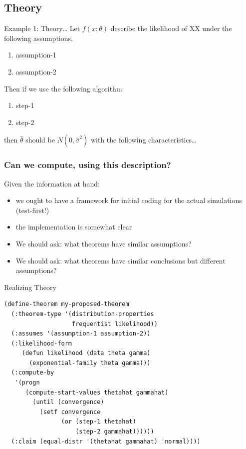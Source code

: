 \documentclass{beamer}
\begin{document}
\subsection{Theory}


\begin{frame}[fragile]{Example 1: Theory\ldots}
  \label{example1}
  Let $f(x;\theta)$ describe the likelihood of XX under the following
  assumptions.  
  \begin{enumerate}
  \item assumption-1
  \item assumption-2
  \end{enumerate}
  Then if we use the following algorithm:
  \begin{enumerate}
  \item step-1
  \item step-2
  \end{enumerate}
  then $\hat{\theta}$ should be $N(0,\hat\sigma^2)$ with the following
  characteristics\ldots
\end{frame}

\begin{frame}
  \frametitle{Can we compute, using this description?}
  Given the information at hand:
  \begin{itemize}
  \item we ought to have a framework for initial coding for the
    actual simulations (test-first!)
  \item the implementation is somewhat clear
  \item We should ask: what theorems have similar assumptions?
  \item We should ask: what theorems have similar conclusions but
    different assumptions?
  \end{itemize}
\end{frame}
\begin{frame}[fragile]{Realizing Theory}
\small{
\begin{verbatim}  
(define-theorem my-proposed-theorem
  (:theorem-type '(distribution-properties
                   frequentist likelihood))
  (:assumes '(assumption-1 assumption-2))
  (:likelihood-form
     (defun likelihood (data theta gamma)
       (exponential-family theta gamma)))
  (:compute-by
   '(progn
      (compute-start-values thetahat gammahat)
        (until (convergence)
          (setf convergence
                (or (step-1 thetahat)
                    (step-2 gammahat))))))
  (:claim (equal-distr '(thetahat gammahat) 'normal))))
\end{verbatim}
}
\end{frame}
\end{document}
